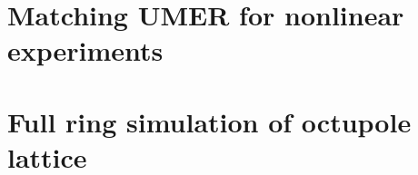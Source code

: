 
\section{Matching UMER for nonlinear experiments}


\section{Full ring simulation of octupole lattice}

